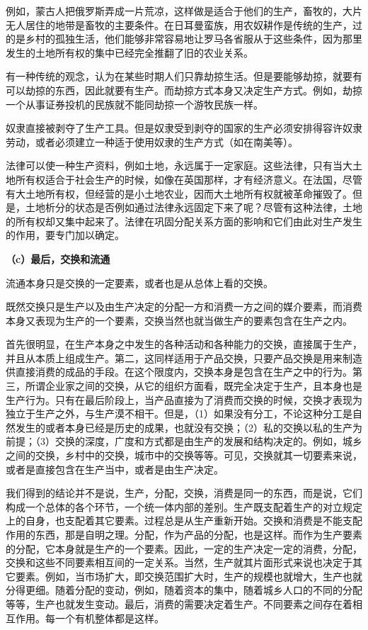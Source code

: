 \documentclass[a4paper,twoside,12pt,AutoFakeBold]{ctexart}
\begin{document}
例如，蒙古人把俄罗斯弄成一片荒凉，这样做是适合于他们的生产，畜牧的，大片无人居住的地带是畜牧的主要条件。在日耳曼蛮族，用农奴耕作是传统的生产，过的是乡村的孤独生活，他们能够非常容易地让罗马各省服从于这些条件，因为那里发生的土地所有权的集中已经完全推翻了旧的农业关系。

有一种传统的观念，认为在某些时期人们只靠劫掠生活。但是要能够劫掠，就要有可以劫掠的东西，因此就要有生产。而劫掠方式本身又决定生产方式。例如，劫掠一个从事证券投机的民族就不能同劫掠一个游牧民族一样。

奴隶直接被剥夺了生产工具。但是奴隶受到剥夺的国家的生产必须安排得容许奴隶劳动，或者必须建立一种适于使用奴隶的生产方式（如在南美等）。

法律可以使一种生产资料，例如土地，永远属于一定家庭。这些法律，只有当大土地所有权适合于社会生产的时候，如像在英国那样，才有经济意义。在法国，尽管有大土地所有权，但经营的是小土地农业，因而大土地所有权就被革命摧毁了。但是，土地析分的状态是否例如通过法律永远固定下来了呢？尽管有这种法律，土地的所有权却又集中起来了。法律在巩固分配关系方面的影响和它们由此对生产发生的作用，要专门加以确定。

\textbf{（c）最后，交换和流通}

流通本身只是交换的一定要素，或者也是从总体上看的交换。

既然交换只是生产以及由生产决定的分配一方和消费一方之间的媒介要素，而消费本身又表现为生产的一个要素，交换当然也就当做生产的要素包含在生产之内。

首先很明显，在生产本身之中发生的各种活动和各种能力的交换，直接属于生产，并且从本质上组成生产。第二，这同样适用于产品交换，只要产品交换是用来制造供直接消费的成品的手段。在这个限度内，交换本身是包含在生产之中的行为。第三，所谓企业家之间的交换，从它的组织方面看，既完全决定于生产，且本身也是生产行为。只有在最后阶段上，当产品直接为了消费而交换的时候，交换才表现为独立于生产之外，与生产漠不相干。但是，（1）如果没有分工，不论这种分工是自然发生的或者本身已经是历史的成果，也就没有交换；（2）私的交换以私的生产为前提；（3）交换的深度，广度和方式都是由生产的发展和结构决定的。例如，城乡之间的交换，乡村中的交换，城市中的交换等等。可见，交换就其一切要素来说，或者是直接包含在生产当中，或者是由生产决定。

我们得到的结论并不是说，生产，分配，交换，消费是同一的东西，而是说，它们构成一个总体的各个环节，一个统一体内部的差别。生产既支配着生产的对立规定上的自身，也支配着其它要素。过程总是从生产重新开始。交换和消费是不能支配作用的东西，那是自明之理。分配，作为产品的分配，也是这样。而作为生产要素的分配，它本身就是生产的一个要素。因此，一定的生产决定一定的消费，分配，交换和这些不同要素相互间的一定关系。当然，生产就其片面形式来说也决定于其它要素。例如，当市场扩大，即交换范围扩大时，生产的规模也就增大，生产也就分得更细。随着分配的变动，例如，随着资本的集中，随着城乡人口的不同的分配等等，生产也就发生变动。最后，消费的需要决定着生产。不同要素之间存在着相互作用。每一个有机整体都是这样。
\end{document}
